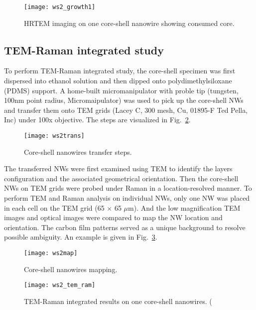 \begin{figure}[htb]
\centering
\texttt{[image: ws2\_growth1]}
\caption[TEM imaging on core-shell NWs: 4]{HRTEM imaging on one core-shell nanowire showing consumed core.}
\label{fig:ch5ws2tem2}
\end{figure}


\subsection{TEM-Raman integrated study} 

To perform TEM-Raman integrated study, the core-shell specimen was first dispersed into ethanol solution and then dipped onto polydimethylsiloxane (PDMS) support. A home-built micromanipulator with proble tip (tungsten, 100nm point radius, Micromaipulator) was used to pick up the core-shell NWs and transfer them onto TEM grids (Lacey C, 300 mesh, Cu, 01895-F Ted Pella, Inc) under 100x objective. The steps are visualized in Fig.~\ref{fig:ch5ws2trans}. 
\begin{figure}[htb]
\centering
\texttt{[image: ws2trans]}
\caption[Manipulating core-shell NWs]{Core-shell nanowires transfer steps. }
\label{fig:ch5ws2trans}
\end{figure}

The transferred NWs were first examined using TEM to identify the  layers configuration and the associated geometrical orientation. Then the core-shell NWs on TEM grids were probed under Raman in a location-resolved manner. To perform TEM and Raman analysis on individual NWs, only one NW was placed in each cell on the TEM grid (65 $\times$ 65 $\mu$m). And the low magnification TEM images and optical images were compared to map the NW location and orientation. The carbon film patterns served as a unique background to resolve possible ambiguity. An example is given in Fig.~\ref{fig:ch5ws2map}. 
\begin{figure}[htb]
\centering
\texttt{[image: ws2map]}
\caption[Mapping core-shell NWs]{Core-shell nanowires mapping. }
\label{fig:ch5ws2map}
\end{figure}



\begin{figure}[htb]
\centering
\texttt{[image: ws2\_tem\_ram]}
\caption[TEM-Raman integrated characterization on core-shell NWs]{TEM-Raman integrated results on one core-shell nanowires. (}
\label{fig:ch5ws2ram}
\end{figure}

